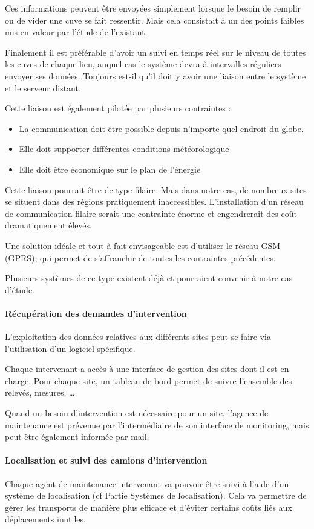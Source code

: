 \documentclass{mise_en_page}
\begin{document}
Ces informations peuvent être envoyées simplement lorsque le besoin de
remplir ou de vider une cuve se fait ressentir. Mais cela consistait à
un des points faibles mis en valeur par l’étude de l’existant.

Finalement il est préférable d’avoir un suivi en temps réel sur le
niveau de toutes les cuves de chaque lieu, auquel cas le système devra
à intervalles réguliers envoyer ses données. Toujours est-il qu’il doit
y avoir une liaison entre le système et le serveur distant. 

Cette liaison est également pilotée par plusieurs contraintes :

\begin{itemize}
\item La communication doit être possible depuis n’importe quel endroit
du globe.
\item Elle doit supporter différentes conditions météorologique
\item Elle doit être économique sur le plan de l’énergie
\end{itemize}
Cette liaison pourrait être de type filaire. Mais dans notre cas, de
nombreux sites se situent dans des régions pratiquement inaccessibles.
L’installation d’un réseau de communication filaire serait une
contrainte énorme et engendrerait des coût dramatiquement élevés. 

Une solution idéale et tout à fait envisageable est d’utiliser le réseau
GSM (GPRS), qui permet de s’affranchir de toutes les contraintes
précédentes.

Plusieurs systèmes de ce type existent déjà et pourraient convenir à
notre cas d’étude.

\paragraph{Récupération des demandes d’intervention}
L’exploitation des données relatives aux différents sites peut se faire
via l’utilisation d’un logiciel spécifique. 

Chaque intervenant a accès à une interface de gestion des sites dont il
est en charge. Pour chaque site, un tableau de bord permet de suivre
l’ensemble des relevés, mesures, …

Quand un besoin d’intervention est nécessaire pour un site, l’agence de
maintenance est prévenue par l’intermédiaire de son interface de
monitoring, mais peut être également informée par mail.

\paragraph{Localisation et suivi des camions d’intervention}
Chaque agent de maintenance intervenant va pouvoir être suivi à l’aide
d’un système de localisation (cf Partie Systèmes de localisation). Cela
va permettre de gérer les transports de manière plus efficace et
d’éviter certains coûts liés aux déplacements inutiles. 
\end{document}
